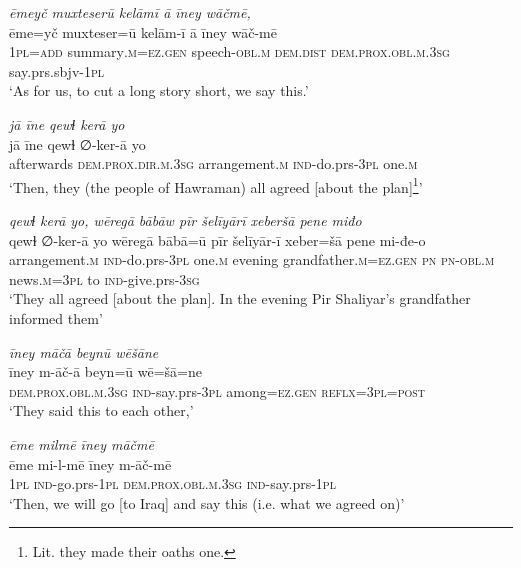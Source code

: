 \ea \label{BP.63}
\textit{ēmeyč muxteserū kelāmī ā īney wāčmē,} \\ 
\gll ēme=yč muxteser=ū kelām-ī ā īney wāč-mē \\ 
 \textsc{1pl}\textsc{=add} summary\textsc{.m}\textsc{=ez.gen} speech\textsc{-obl}\textsc{.m} \textsc{dem.dist} \textsc{dem.prox}\textsc{.obl}\textsc{.m}\textsc{.3sg} say.prs.sbjv\textsc{-\textsc{1pl}} \\ 
\glt `As for us, to cut a long story short, we say this.'
\z 
 
\ea \label{BP.64}
\textit{jā īne qewɫ kerā yo} \\ 
\gll jā īne qewɫ ∅-ker-ā yo \\ 
 afterwards \textsc{dem.prox}\textsc{.dir}\textsc{.m}\textsc{.3sg} arrangement\textsc{.m} \textsc{ind-}do.prs\textsc{-3pl} one\textsc{.m} \\ 
\glt `Then, they (the people of Hawraman) all agreed [about the plan]\footnote{Lit. they made their oaths one.}'
\z 
 
\ea \label{BP.65}
\textit{qewɫ kerā yo, wēregā bābāw pīr šelīyārī xeberšā pene miđo} \\ 
\gll qewɫ ∅-ker-ā yo wēregā bābā=ū pīr šelīyār-ī xeber=šā pene mi-đe-o \\ 
 arrangement\textsc{.m} \textsc{ind-}do.prs\textsc{-3pl} one\textsc{.m} evening grandfather\textsc{.m}\textsc{=ez.gen} \textsc{pn} \textsc{pn}\textsc{-obl}\textsc{.m} news\textsc{.m}\textsc{=3pl} to \textsc{ind-}give.prs\textsc{-3sg} \\ 
\glt `They all agreed [about the plan]. In the evening Pir Shaliyar’s grandfather informed them'
\z 
 
\ea \label{BP.66}
\textit{īney māčā beynū wēšāne} \\ 
\gll īney m-āč-ā beyn=ū wē=šā=ne \\ 
 \textsc{dem.prox}\textsc{.obl}\textsc{.m}\textsc{.3sg} \textsc{ind-}say.prs\textsc{-3pl} among\textsc{=ez.gen} \textsc{reflx}\textsc{=3pl}\textsc{=\textsc{post}} \\ 
\glt `They said this to each other,'
\z 
 
\ea \label{BP.68}
\textit{ēme milmē īney māčmē} \\ 
\gll ēme mi-l-mē īney m-āč-mē \\ 
 \textsc{1pl} \textsc{ind-}go.prs\textsc{-\textsc{1pl}} \textsc{dem.prox}\textsc{.obl}\textsc{.m}\textsc{.3sg} \textsc{ind-}say.prs\textsc{-\textsc{1pl}} \\ 
\glt `Then, we will go [to Iraq] and say this (i.e. what we agreed on)'
\z 
 
